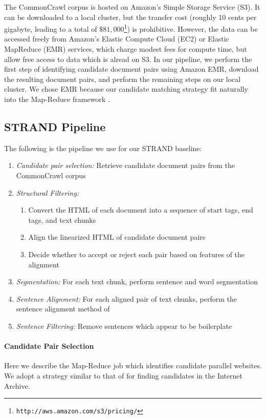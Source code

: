 The CommonCrawl corpus is hosted on Amazon's Simple Storage Service (S3). It can
be downloaded to a local cluster, but the transfer cost (roughly 10 cents per
gigabyte, leading to a total of $\$81,000$\footnote{{\tt http://aws.amazon.com/s3/pricing/}})
is prohibitive. However, the data can be
accessed freely from Amazon's Elastic Compute Cloud (EC2) or Elastic MapReduce
(EMR) services, which charge modest fees for compute time, but allow free access
to data which is alread on S3. In our pipeline, we perform the first step of identifying
candidate document pairs using Amazon EMR, download the resulting document
pairs, and perform the remaining steps on our local cluster. We chose EMR
because our candidate matching strategy fit naturally into the Map-Reduce
framework \citep{Dean04}.

\subsection{STRAND Pipeline}

The following is the pipeline we use for our STRAND \citep{Resnik03} baseline:

\begin{enumerate}
\item {\em Candidate pair selection:} Retrieve candidate document pairs from the
CommonCrawl corpus
\item {\em Structural Filtering:}
  \begin{enumerate}
  \item Convert the HTML of each document into a sequence of start tags, end tags,
  and text chunks
  \item Align the linearized HTML of candidate document pairs
  \item Decide whether to accept or reject each pair based on features of the
  alignment
  \end{enumerate}
\item {\em Segmentation:} For each text chunk, perform sentence and word
segmentation
\item {\em Sentence Alignment:} For each aligned pair of text chunks, perform
the sentence alignment method of \citet{Gale93}
\item {\em Sentence Filtering:} Remove sentences which appear to be boilerplate
\label{enum:strand}
\end{enumerate}

\paragraph{Candidate Pair Selection}
Here we describe the Map-Reduce job which identifies candidate parallel
websites. We adopt a strategy similar to that of \citet{Resnik03} for finding
candidates in the Internet Archive.


